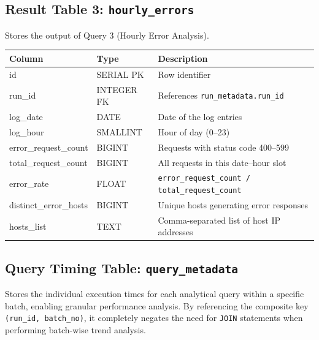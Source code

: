 \documentclass[11pt,a4paper]{article}
\begin{document}
\subsection{Result Table 3: \texttt{hourly\_errors}}

Stores the output of Query 3 (Hourly Error Analysis).

\begin{schematable}
\begin{tabularx}{\linewidth}{@{} >{\ttfamily\small}l >{\small}l X @{}}
\toprule
\textnormal{\textbf{Column}} & \textbf{Type} & \textbf{Description} \\
\midrule
id                    & SERIAL PK  & Row identifier \\
run\_id               & INTEGER FK & References \texttt{run\_metadata.run\_id} \\
log\_date             & DATE       & Date of the log entries \\
log\_hour             & SMALLINT   & Hour of day (0--23) \\
error\_request\_count  & BIGINT     & Requests with status code 400--599 \\
total\_request\_count  & BIGINT     & All requests in this date--hour slot \\
error\_rate           & FLOAT      & \texttt{error\_request\_count / total\_request\_count} \\
distinct\_error\_hosts & BIGINT     & Unique hosts generating error responses \\
hosts_list           & TEXT       & Comma-separated list of host IP addresses \\
\bottomrule
\end{tabularx}
\end{schematable}

\subsection{Query Timing Table: \texttt{query\_metadata}}

Stores the individual execution times for each analytical query within a specific batch, enabling granular performance analysis. By referencing the composite key \texttt{(run\_id, batch\_no)}, it completely negates the need for \texttt{JOIN} statements when performing batch-wise trend analysis.
\end{document}
